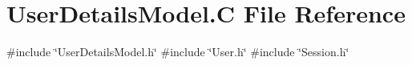 \hypertarget{_user_details_model_8_c}{}\section{User\+Details\+Model.\+C File Reference}
\label{_user_details_model_8_c}
{\ttfamily \#include \char`\"{}User\+Details\+Model.\+h\char`\"{}}\newline
{\ttfamily \#include \char`\"{}User.\+h\char`\"{}}\newline
{\ttfamily \#include \char`\"{}Session.\+h\char`\"{}}\newline
